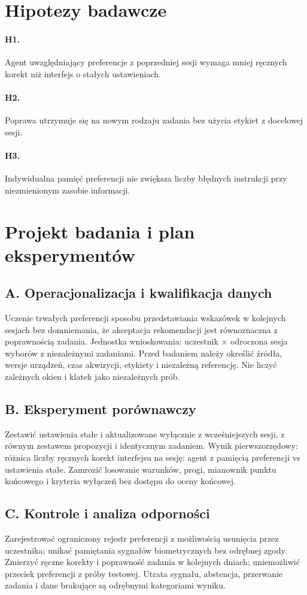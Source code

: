 \documentclass[11pt,a4paper]{article}
\begin{document}
\section{Hipotezy badawcze}
\paragraph{H1.} Agent uwzględniający preferencje z poprzedniej sesji wymaga mniej ręcznych korekt niż interfejs o stałych ustawieniach.
\paragraph{H2.} Poprawa utrzymuje się na nowym rodzaju zadania bez użycia etykiet z docelowej sesji.
\paragraph{H3.} Indywidualna pamięć preferencji nie zwiększa liczby błędnych instrukcji przy niezmienionym zasobie informacji.
\section{Projekt badania i plan eksperymentów}
\subsection{A. Operacjonalizacja i kwalifikacja danych}
Uczenie trwałych preferencji sposobu przedstawiania wskazówek w kolejnych sesjach bez domniemania, że akceptacja rekomendacji jest równoznaczna z poprawnością zadania. Jednostka wnioskowania: uczestnik × odroczona sesja wyborów z niezależnymi zadaniami. Przed badaniem należy określić źródła, wersje urządzeń, czas akwizycji, etykiety i niezależną referencję. Nie liczyć zależnych okien i klatek jako niezależnych prób.
\subsection{B. Eksperyment porównawczy}
Zestawić ustawienia stałe i aktualizowane wyłącznie z wcześniejszych sesji, z równym zestawem propozycji i identycznym zadaniem. Wynik pierwszorzędowy: różnica liczby ręcznych korekt interfejsu na sesję: agent z pamięcią preferencji vs ustawienia stałe. Zamrozić losowanie warunków, progi, mianownik punktu końcowego i kryteria wyłączeń bez dostępu do oceny końcowej.
\subsection{C. Kontrole i analiza odporności}
Zarejestrować ograniczony rejestr preferencji z możliwością usunięcia przez uczestnika; unikać pamiętania sygnałów biometrycznych bez odrębnej zgody. Zmierzyć ręczne korekty i poprawność zadania w kolejnych dniach; uniemożliwić przeciek preferencji z próby testowej. Utrata sygnału, abstencja, przerwanie zadania i dane brakujące są odrębnymi kategoriami wyniku.
\end{document}
